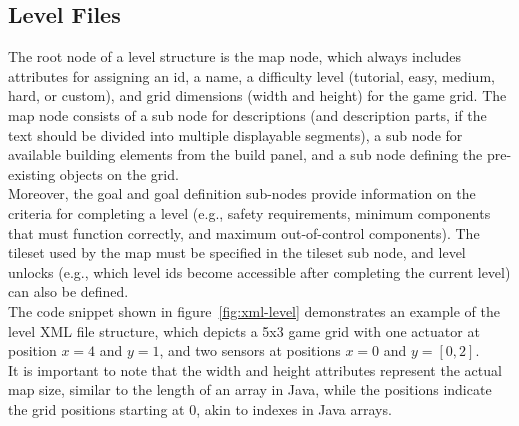 \subsection{Level Files}\label{subsec:level-files}
The root node of a level structure is the map node, which always includes attributes for assigning an id, a name,
a difficulty level (tutorial, easy, medium, hard, or custom), and grid dimensions (width and height) for the game grid.
The map node consists of a sub node for descriptions (and description parts, if the text should be divided into multiple displayable segments),
a sub node for available building elements from the build panel, and a sub node defining the pre-existing objects on the grid.
\\
Moreover, the goal and goal definition sub-nodes provide information on the criteria for completing a level (e.g.,
safety requirements, minimum components that must function correctly, and maximum out-of-control components).
The tileset used by the map must be specified in the tileset sub node,
and level unlocks (e.g., which level ids become accessible after completing the current level) can also be defined.
\\
The code snippet shown in figure~\ref{fig:xml-level} demonstrates an example of the level \gls{XML} file structure, which depicts a 5x3 game grid with one actuator at position $x = 4$ and $y = 1$,
and two sensors at positions $x = 0$ and $y = [0, 2]$.
\\
It is important to note that the width and height attributes represent the actual map size, similar to the length of an array in Java,
while the positions indicate the grid positions starting at 0, akin to indexes in Java arrays.
